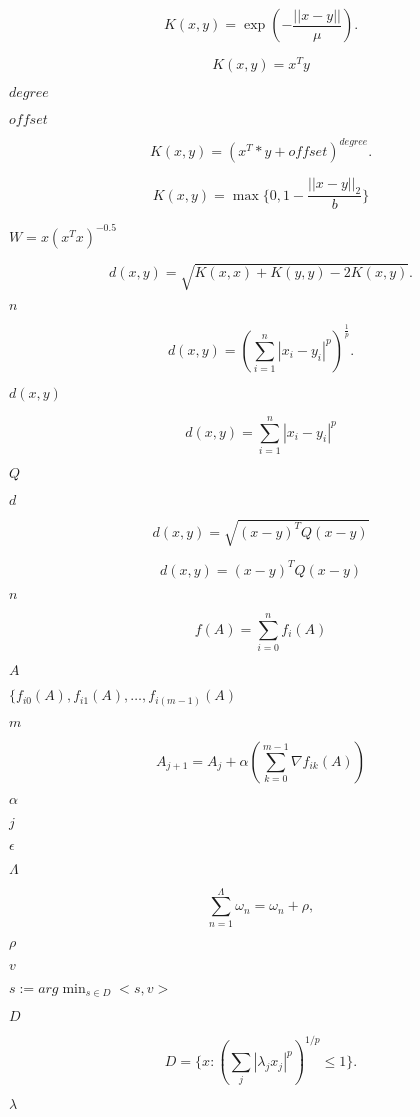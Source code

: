 \documentclass{article}
\begin{document}
\[ K(x, y) = \exp(-\frac{|| x - y ||}{\mu}). \]
\pagebreak

\[ K(x, y) = x^T y \]
\pagebreak

$ degree $
\pagebreak

$ offset $
\pagebreak

\[ K(x, y) = (x^T * y + offset) ^ {degree}. \]
\pagebreak

\[ K(x, y) = \max \{ 0, 1 - \frac{|| x - y ||_2}{b} \} \]
\pagebreak

$ W = x (x^T x)^{-0.5} $
\pagebreak

\[ d(x, y) = \sqrt{ K(x, x) + K(y, y) - 2K(x, y) }. \]
\pagebreak

$ n $
\pagebreak

\[ d(x, y) = \left( \sum_{i = 1}^{n} | x_i - y_i |^p \right)^{\frac{1}{p}}. \]
\pagebreak

$ d(x, y) $
\pagebreak

\[ d(x, y) = \sum_{i = 1}^{n} | x_i - y_i |^p \]
\pagebreak

$ Q $
\pagebreak

$ d $
\pagebreak

\[ d(x, y) = \sqrt{(x - y)^T Q (x - y)} \]
\pagebreak

\[ d(x, y) = (x - y)^T Q (x - y) \]
\pagebreak

$n$
\pagebreak

\[ f(A) = \sum_{i = 0}^{n} f_i(A) \]
\pagebreak

$ A $
\pagebreak

$ \{ f_{i0}(A), f_{i1}(A), \ldots, f_{i(m - 1)}(A) $
\pagebreak

$ m $
\pagebreak

\[ A_{j + 1} = A_j + \alpha \left(\sum_{k = 0}^{m - 1} \nabla f_{ik}(A) \right) \]
\pagebreak

$ \alpha $
\pagebreak

$ j $
\pagebreak

$ \epsilon $
\pagebreak

$ \Lambda $
\pagebreak

\[ \sum_{n=1}^{\Lambda}\omega_n = \omega_n + \rho, \]
\pagebreak

$ \rho $
\pagebreak

$ v $
\pagebreak

$ s:=arg\min_{s\in D} <s, v> $
\pagebreak

$ D $
\pagebreak

\[ D = \{ x: (\sum_j|\lambda_j x_j|^p)^{1/p}\leq 1 \}. \]
\pagebreak

$ \lambda $
\pagebreak
\end{document}
